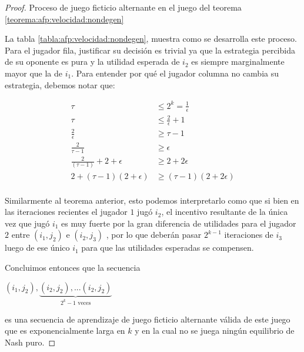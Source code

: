 \begin{proof}
    \begin{table}
        
        \caption{Proceso de juego ficticio alternante en el juego del teorema \ref{teorema:afp:velocidad:nondegen}}
        \label{tabla:afp:velocidad:nondegen}
    \end{table}

    La tabla \ref{tabla:afp:velocidad:nondegen}, muestra como se desarrolla este proceso. Para el jugador fila, justificar su decisión es trivial ya que la estrategia percibida de su oponente es pura y la utilidad esperada de  $i_2$ es siempre marginalmente mayor que la de $i_1$. Para entender por qué el jugador columna no cambia su estrategia, debemos notar que:

    \begin{align*}
        \tau &\le 2^k = \frac{1}{\epsilon} \\
        \tau &\le \frac{2}{\epsilon} + 1 \\
        \frac{2}{\epsilon} &\ge \tau - 1 \\
        \frac{2}{\tau - 1} &\ge \epsilon \\
        \frac{2}{(\tau - 1)} + 2 + \epsilon &\ge 2 + 2 \epsilon \\
        2 + (\tau - 1) (2 + \epsilon) &\ge (\tau - 1) (2 + 2 \epsilon) \\
    \end{align*}

    Similarmente al teorema anterior, esto podemos interpretarlo como que si bien en las iteraciones recientes el jugador $1$ jugó $i_2$, el incentivo resultante de la única vez que jugó $i_1$ es muy fuerte por la gran diferencia de utilidades para el jugador $2$ entre $(i_1, j_2)$ e $(i_2, j_3)$ , por lo que deberán pasar $2^{k-1}$ iteraciones de $i_3$ luego de ese único $i_1$ para que las utilidades esperadas se compensen.

    Concluimos entonces que la secuencia

    \begin{center}
    \begin{math}
        (i_1, j_2), \underbrace{(i_2, j_2), ... (i_2, j_2)}_{\text{$2^k - 1$ veces}}
    \end{math}
    \end{center}

    es una secuencia de aprendizaje de juego ficticio alternante válida de este juego que es exponencialmente larga en $k$ y en la cual no se juega ningún equilibrio de Nash puro.
\end{proof}

